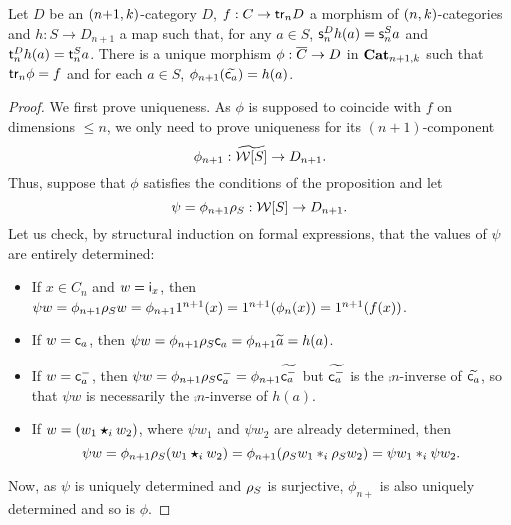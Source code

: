 \begin{proposition}\label{prop:univprop}
   Let $D$ be an  $(n{+}1,k)$-category $D$, $f:C\to\mathsf{tr}_{n} D$ a
   morphism of $(n,k)$-categories
   and  $h:S\to D_{n+1}$ a map such that, for any $a\in S$, $\mathsf{s}_{n}^Dh(a)=\mathsf{s}_{n}^S a$
    and $\mathsf{t}_{n}^D h(a)=\mathsf{t}_{n}^S a$.  There is a unique
    morphism $\phi:\overline{C}\to D$ in $\mathbf{Cat}_{n+1,k}$ such that $\mathsf{tr}_{n}\phi=f$ and for each $a\in S$, $\phi_{n+1}(\widetilde{\mathsf{c}_{a}})=h(a)$.
  \end{proposition}
  \begin{proof}
We first prove uniqueness. As $\phi$ is supposed to coincide with $f$ on
dimensions $\leq n$, we only need to prove uniqueness for its
$(n{+}1)$-component
\[\phi_{n+1}:\widetilde{\mathcal{W}[S]}\to D_{n+1}.\]
 Thus, suppose
that $\phi$ satisfies the conditions of the proposition and let
\[\psi=\phi_{n+1} \rho_{S}:\mathcal{W}[S]\to D_{n+1}.\]
   Let us check,
   by structural induction on formal expressions, that the values of
   $\psi$ are entirely determined:
   \begin{itemize}
   \item If $x\in C_n$ and $w=\mathsf{i}_{x}$, then $\psi w=\phi_{n+1}\rho_{S}
     w=\phi_{n+1}1^{n+1}(x)=1^{n+1}(\phi_n(x))=1^{n+1}(f(x))$.
   \item If $w=\mathsf{c}_{a}$, then $\psi
     w=\phi_{n+1}\rho_{S}{\mathsf{c}_{a}}=\phi_{n+1}\widetilde{a}=h(a)$.
   \item If $w=\mathsf{c}^{-}_{a}$, then $\psi w=\phi_{n+1}\rho_{S}{\mathsf{c}^{-}_{a}}=\phi_{n+1}\widetilde{\mathsf{c}^{-}_{a}}$ but $\widetilde{\mathsf{c}^{-}_{a}}$ is the $\comp n$-inverse of
     $\widetilde{\mathsf{c}_{a}}$, so that $\psi w$ is necessarily the $\comp
     n$-inverse of $h(a)$.
   \item If $w=(w_1\bm{\star}_{i} w_2)$, where $\psi w_1$ and $\psi w_2$ are
     already determined, then
     \[\psi w=\phi_{n+1}\rho_{S}{(w_1\bm{\star}_{i} w_2)}=\phi_{n+1}(\rho_{S}{ w_1}\ast_{i} \rho_{S}
      { w_2})=\psi w_1\ast_{i} \psi w_2.\]
  \end{itemize}
  Now, as $\psi$ is uniquely determined and $\rho_{S}$  is surjective,
  $\phi_{n+}$ is also uniquely determined and so is $\phi$.


\end{proof}
